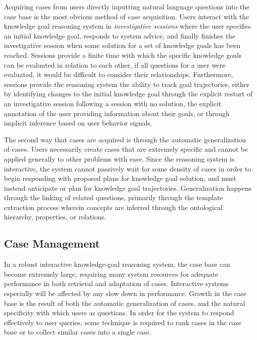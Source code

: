 \documentclass[11pt,letterpaper]{article}
\begin{document}
Acquiring cases from users directly inputting natural language questions into the case base is the most obvious method of case acquisition. Users interact with the knowledge goal reasoning system in \textit{investigative sessions} where the user specifies an initial knowledge goal, responds to system advice, and finally finishes the investigative session when some solution for a set of knowledge goals has been reached. Sessions provide a finite time with which the specific knowledge goals can be evaluated in relation to each other, if all questions for a user were evaluated, it would be difficult to consider their relationships. Furthermore, sessions provide the reasoning system the ability to track goal trajectories, either by identifying changes to the initial knowledge goal through the explicit restart of an investigative session following a session with no solution, the explicit annotation of the user providing information about their goals, or through implicit inference based on user behavior signals.

The second way that cases are acquired is through the automatic generalization of cases. Users necessarily create cases that are extremely specific and cannot be applied generally to other problems with ease. Since the reasoning system is interactive, the system cannot passively wait for some density of cases in order to begin responding with proposed plans for knowledge goal solution, and must instead anticipate or plan for knowledge goal trajectories. Generalization happens through the linking of related questions, primarily through the template extraction process wherein concepts are inferred through the ontological hierarchy, properties, or relations.

\subsection{Case Management}

In a robust interactive knowledge-goal reasoning system, the case base can become extremely large, requiring many system resources for adequate performance in both retrieval and adaptation of cases. Interactive systems especially will be affected by any slow down in performance. Growth in the case base is the result of both the automatic generalization of cases, and the natural specificity with which users as questions. In order for the system to respond effectively to user queries, some technique is required to rank cases in the case base or to collect similar cases into a single case.
\end{document}
